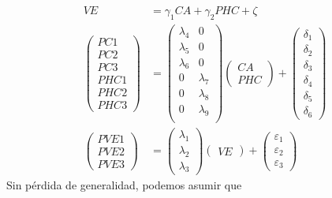 \documentclass[
  english]{revcoles}
\begin{document}
\begin{align*}
    VE                        & = \gamma_1 CA + \gamma_2 PHC + \zeta                                              \\
    \begin{pmatrix}
        PC1  \\
        PC2  \\
        PC3  \\
        PHC1 \\
        PHC2 \\
        PHC3
    \end{pmatrix} & = \begin{pmatrix}
        \lambda_4 & 0         \\
        \lambda_5 & 0         \\
        \lambda_6 & 0         \\
        0         & \lambda_7 \\
        0         & \lambda_8 \\
        0         & \lambda_9 \\
    \end{pmatrix} \begin{pmatrix}
        CA \\
        PHC
    \end{pmatrix} + \begin{pmatrix}
        \delta_1 \\
        \delta_2 \\
        \delta_3 \\
        \delta_4 \\
        \delta_5 \\
        \delta_6
    \end{pmatrix} \\
    \begin{pmatrix}
        PVE1 \\
        PVE2 \\
        PVE3
    \end{pmatrix} & = \begin{pmatrix}
        \lambda_1 \\
        \lambda_2 \\
        \lambda_3
    \end{pmatrix} \begin{pmatrix}
        VE
    \end{pmatrix} + \begin{pmatrix}
        \varepsilon_1 \\
        \varepsilon_2 \\
        \varepsilon_3
    \end{pmatrix}
\end{align*} Sin pérdida de generalidad, podemos asumir que
\end{document}
